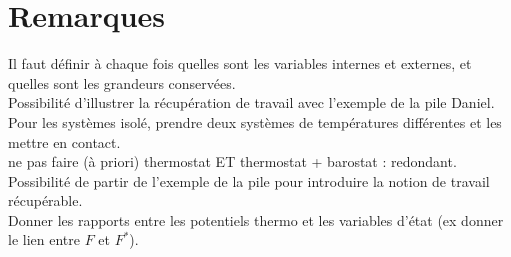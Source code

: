 \documentclass[12pt,prb,aps,epsf]{article}
\begin{document}
\section*{Remarques}
Il faut définir à chaque fois quelles sont les variables internes et externes, et quelles sont les grandeurs conservées.\\
Possibilité d'illustrer la récupération de travail avec l'exemple de la pile Daniel. \\
Pour les systèmes isolé, prendre deux systèmes de températures différentes et les mettre en contact.\\
ne pas faire (à priori) thermostat ET thermostat + barostat : redondant.\\
Possibilité de partir de l'exemple de la pile pour introduire la notion de travail récupérable.\\
Donner les rapports entre les potentiels thermo et les variables d'état (ex donner le lien entre $F$ et $F^*$).
\end{document}
